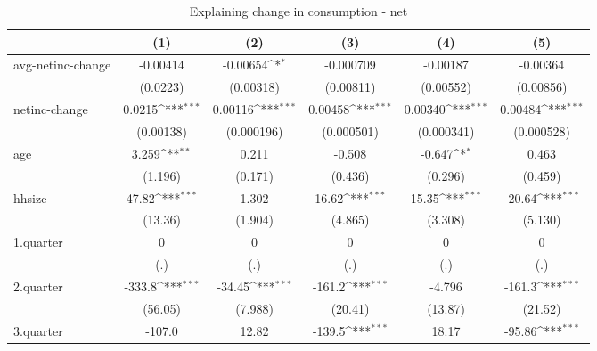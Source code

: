 \begin{table}[!h]\centering
\def\sym#1{\ifmmode^{#1}\else\(^{#1}\)\fi}
\caption{\label{tab:2.1C-deltacons-net} Explaining change in consumption - net}
\begin{tabular}{l*{5}{c}}
\hline\hline
            &\multicolumn{1}{c}{(1)}         &\multicolumn{1}{c}{(2)}         &\multicolumn{1}{c}{(3)}         &\multicolumn{1}{c}{(4)}         &\multicolumn{1}{c}{(5)}         \\
\hline
avg-netinc-change&    -0.00414         &    -0.00654\sym{*}  &   -0.000709         &    -0.00187         &    -0.00364         \\
            &    (0.0223)         &   (0.00318)         &   (0.00811)         &   (0.00552)         &   (0.00856)         \\
netinc-change&      0.0215\sym{***}&     0.00116\sym{***}&     0.00458\sym{***}&     0.00340\sym{***}&     0.00484\sym{***}\\
            &   (0.00138)         &  (0.000196)         &  (0.000501)         &  (0.000341)         &  (0.000528)         \\
age         &       3.259\sym{**} &       0.211         &      -0.508         &      -0.647\sym{*}  &       0.463         \\
            &     (1.196)         &     (0.171)         &     (0.436)         &     (0.296)         &     (0.459)         \\
hhsize      &       47.82\sym{***}&       1.302         &       16.62\sym{***}&       15.35\sym{***}&      -20.64\sym{***}\\
            &     (13.36)         &     (1.904)         &     (4.865)         &     (3.308)         &     (5.130)         \\
1.quarter   &           0         &           0         &           0         &           0         &           0         \\
            &         (.)         &         (.)         &         (.)         &         (.)         &         (.)         \\
2.quarter   &      -333.8\sym{***}&      -34.45\sym{***}&      -161.2\sym{***}&      -4.796         &      -161.3\sym{***}\\
            &     (56.05)         &     (7.988)         &     (20.41)         &     (13.87)         &     (21.52)         \\
3.quarter   &      -107.0         &       12.82         &      -139.5\sym{***}&       18.17         &      -95.86\sym{***}\\

\end{tabular}
\end{table}

